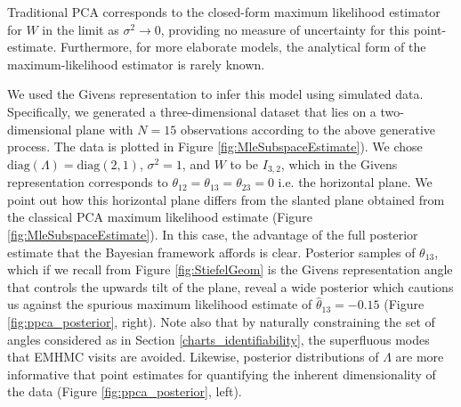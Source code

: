 \documentclass[ba]{imsart}
\numberwithin{equation}{section}
\theoremstyle{plain}
\begin{document}
\noindent Traditional PCA corresponds to the closed-form maximum likelihood estimator for $W$ in the limit as $\sigma^2 \to 0$,  providing no measure of uncertainty for this point-estimate. Furthermore, for more elaborate models, the analytical form of the maximum-likelihood estimator is rarely known.

\noindent We used the Givens representation to infer this model using simulated data. Specifically, we generated a three-dimensional dataset that lies on a two-dimensional plane with $N =15$ observations according to the above generative process. The data is plotted in Figure \ref{fig:MleSubspaceEstimate}). We chose $\mathrm{diag}(\Lambda) =\mathrm{diag}(2, 1)$, $\sigma^2 = 1$, and $W$ to be $I_{3,2}$, which in the Givens representation corresponds to $\theta_{12} = \theta_{13} = \theta_{23} = 0$ i.e. the horizontal plane. We point out how this horizontal plane differs from the slanted plane obtained from the classical PCA maximum likelihood estimate (Figure \ref{fig:MleSubspaceEstimate}). In this case, the advantage of the full posterior estimate that the Bayesian framework affords is clear. Posterior samples of $\theta_{13}$, which if we recall from Figure \ref{fig:StiefelGeom} is the Givens representation angle that controls the upwards tilt of the plane, reveal a wide posterior which cautions us against the spurious maximum likelihood estimate of $\hat{\theta}_{13} = -0.15$ (Figure \ref{fig:ppca_posterior}, right). Note also that by naturally constraining the set of angles considered as in Section \ref{charts_identifiability}, the superfluous modes that EMHMC visits are avoided. Likewise, posterior distributions of $\Lambda$ are more informative that point estimates for quantifying the inherent dimensionality of the data (Figure \ref{fig:ppca_posterior}, left).
\end{document}

